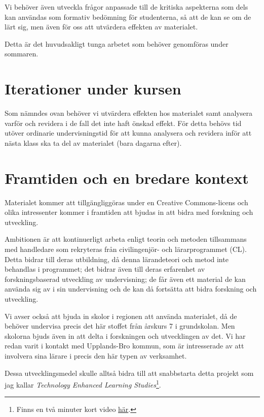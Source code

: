 \documentclass[a4paper,swedish]{article}
\begin{document}
Vi behöver även utveckla frågor anpassade till de kritiska aspekterna som dels 
kan användas som formativ bedömning för studenterna, så att de kan se om de 
lärt sig, men även för oss att utvärdera effekten av materialet.

Detta är det huvudsakligt tunga arbetet som behöver genomföras under sommaren.


\section{Iterationer under kursen}\label{iterationer}

Som nämndes ovan behöver vi utvärdera effekten hos materialet samt analysera 
varför och revidera i de fall det inte haft önskad effekt.
För detta behövs tid utöver ordinarie undervisningstid för att kunna analysera 
och revidera inför att nästa klass ska ta del av materialet (bara dagarna 
efter).


\section*{Framtiden och en bredare kontext}

Materialet kommer att tillgängliggöras under en Creative Commons-licens och 
olika intressenter kommer i framtiden att bjudas in att bidra med forskning och 
utveckling.

Ambitionen är att kontinuerligt arbeta enligt teorin och metoden tillsammans 
med handledare som rekryteras från civilingenjör- och lärarprogrammet (CL).
Detta bidrar till deras utbildning, då denna lärandeteori och metod inte 
behandlas i programmet; det bidrar även till deras erfarenhet av 
forskningsbaserad utveckling av undervisning; de får även ett material de kan 
använda sig av i sin undervisning och de kan då fortsätta att bidra forskning 
och utveckling.

Vi avser också att bjuda in skolor i regionen att använda materialet, då de 
behöver undervisa precis det här stoffet från årskurs 7 i grundskolan.
Men skolorna bjuds även in att delta i forskningen och utvecklingen av det.
Vi har redan varit i kontakt med Upplands-Bro kommun, som är intresserade av 
att involvera sina lärare i precis den här typen av verksamhet.

Dessa utvecklingsmedel skulle alltså bidra till att snabbstarta detta projekt 
som jag kallar \emph{Technology Enhanced Learning Studies}\footnote{%
  Finns en två minuter kort video \href{https://youtu.be/uByy1fJ0Yro}{här}.
}.


\printbibliography
\end{document}
